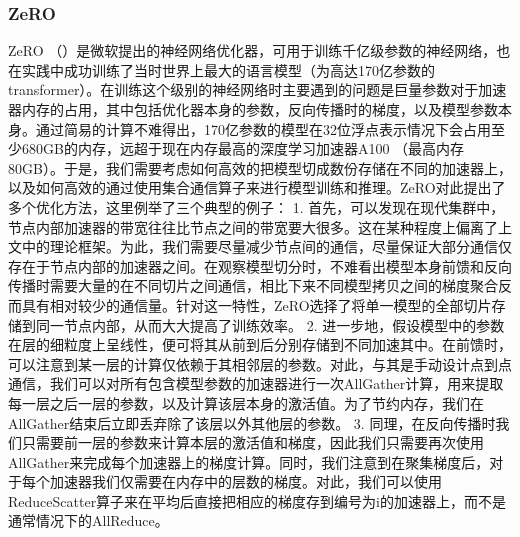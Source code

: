 \documentclass[letterpaper,10pt,english]{sphinxmanual}
\begin{document}
\subsubsection{ZeRO}
\label{\detokenize{chapter_distributed_training/collective:zero}}
\sphinxAtStartPar
ZeRO
（）是微软提出的神经网络优化器，可用于训练千亿级参数的神经网络，也在实践中成功训练了当时世界上最大的语言模型（为高达170亿参数的transformer）。在训练这个级别的神经网络时主要遇到的问题是巨量参数对于加速器内存的占用，其中包括优化器本身的参数，反向传播时的梯度，以及模型参数本身。通过简易的计算不难得出，170亿参数的模型在32位浮点表示情况下会占用至少680GB的内存，远超于现在内存最高的深度学习加速器A100
（最高内存80GB）。于是，我们需要考虑如何高效的把模型切成数份存储在不同的加速器上，以及如何高效的通过使用集合通信算子来进行模型训练和推理。ZeRO对此提出了多个优化方法，这里例举了三个典型的例子：
1.
首先，可以发现在现代集群中，节点内部加速器的带宽往往比节点之间的带宽要大很多。这在某种程度上偏离了上文中的理论框架。为此，我们需要尽量减少节点间的通信，尽量保证大部分通信仅存在于节点内部的加速器之间。在观察模型切分时，不难看出模型本身前馈和反向传播时需要大量的在不同切片之间通信，相比下来不同模型拷贝之间的梯度聚合反而具有相对较少的通信量。针对这一特性，ZeRO选择了将单一模型的全部切片存储到同一节点内部，从而大大提高了训练效率。
2.
进一步地，假设模型中的参数在层的细粒度上呈线性，便可将其从前到后分别存储到不同加速其中。在前馈时，可以注意到某一层的计算仅依赖于其相邻层的参数。对此，与其是手动设计点到点通信，我们可以对所有包含模型参数的加速器进行一次AllGather计算，用来提取每一层之后一层的参数，以及计算该层本身的激活值。为了节约内存，我们在AllGather结束后立即丢弃除了该层以外其他层的参数。
3.
同理，在反向传播时我们只需要前一层的参数来计算本层的激活值和梯度，因此我们只需要再次使用AllGather来完成每个加速器上的梯度计算。同时，我们注意到在聚集梯度后，对于每个加速器我们仅需要在内存中的层数的梯度。对此，我们可以使用ReduceScatter算子来在平均后直接把相应的梯度存到编号为i的加速器上，而不是通常情况下的AllReduce。
\end{document}
